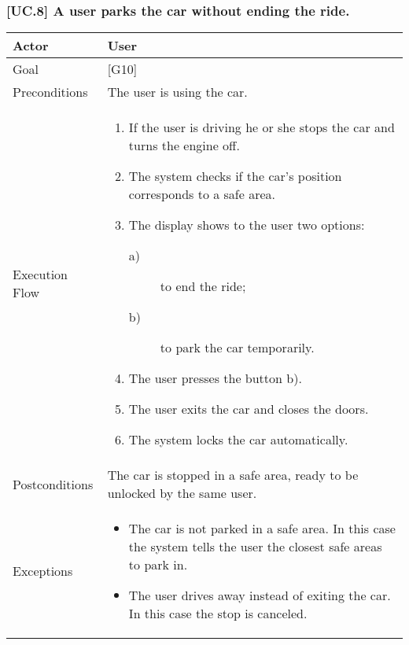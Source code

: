 \documentclass[english]{article}
\begin{document}
\subsubsection{[UC.8] A user parks the car without ending the ride.}
		\begin{tabularx}{\textwidth}{  l  X  }
			\hline
			Actor & User\\
			\hline
			Goal & [G10]\\
			\hline
			Preconditions & The user is using the car.\\
			\hline
			Execution Flow & \begin{enumerate}
				\item{If the user is driving he or she stops the car and turns the engine off.}
				\item{The system checks if the car's position corresponds to a safe area.}
				\item{The display shows to the user two options:
					\begin{description}
						\item[a)]{ to end the ride;}
						\item[b)]{ to park the car temporarily.}
					\end{description}}
					\item{The user presses the button b).}
					\item{The user exits the car and closes the doors.}
					\item{The system locks the car automatically.}
				\end{enumerate}\\
				\hline
				Postconditions & The car is stopped in a safe area, ready to be unlocked by the same user.\\
				\hline
				Exceptions & \begin{itemize}
					\item{The car is not parked in a safe area. In this case the system tells the user the closest safe areas to park in.}
					\item{The user drives away instead of exiting the car. In this case the stop is canceled.}
				\end{itemize}\\
				\hline
		\end{tabularx}
						
\end{document}

